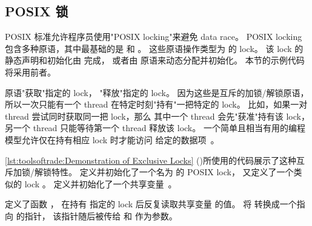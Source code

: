 \subsection{POSIX 锁}
\label{sec:toolsoftrade:POSIX Locking}

POSIX 标准允许程序员使用"POSIX locking"来避免 data race。
POSIX locking 包含多种原语，其中最基础的是
 和 。
这些原语操作类型为  的 lock。
该 lock 的静态声明和初始化由
 完成，
或者由  原语来动态分配并初始化。
本节的示例代码将采用前者。

 原语"获取"指定的 lock，
 "释放"指定的 lock。
因为这些是互斥的加锁/解锁原语，
所以一次只能有一个 thread 在特定时刻"持有"一把特定的 lock。
比如，如果一对 thread 尝试同时获取同一把 lock，那么
其中一个 thread 会先"获准"持有该 lock，
另一个 thread 只能等待第一个 thread 释放该 lock。
一个简单且相当有用的编程模型允许仅在持有相应 lock 时才能访问
给定的数据项~\cite{Hoare74}。

\QuickQuizEnd

\begin{listing}
\caption{互斥 Lock 的演示}
\label{lst:toolsoftrade:Demonstration of Exclusive Locks}
\end{listing}

\begin{fcvref}
\cref{lst:toolsoftrade:Demonstration of Exclusive Locks}
()所使用的代码展示了这种互斥加锁/解锁特性。
定义并初始化了一个名为  的 POSIX lock，
又定义了一个类似的 lock 。
定义并初始化了一个共享变量~。
\end{fcvref}

\begin{fcvref}
定义了函数 ，
在持有  指定的 lock 后反复读取共享变量  的值。
将  转换成一个指向  的指针，
该指针随后被传给  和 
作为参数。
\end{fcvref}

